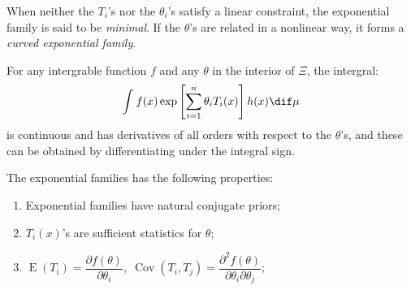 \begin{definition}
	When neither the $T_i$'s nor the $\theta_i$'s satisfy a linear constraint, the exponential family is said to be \emph{minimal}. If the $\theta$'s are related in a nonlinear way, it forms a \emph{curved exponential family}.
\end{definition}
\begin{theorem}\label{theo:ExponentialFamilyDiff}
	For any intergrable function $f$ and any $\theta$ in the interior of $\Xi$, the intergral:
	\begin{equation*}
		\int_{}^{}f(x)\exp\left[\sum_{i=1}^{n}\theta_iT_i(x)\right]h(x)\dif\mu
	\end{equation*}
	is continuous and has derivatives of all orders with respect to the $\theta$'s, and these can be obtained by differentiating under the integral sign.
\end{theorem}
\begin{property}
	The exponential families has the following properties:
	\begin{enumerate}
		\item Exponential families have natural conjugate priors;
		\item $T_i(x)$'s are sufficient statistics for $\theta$;
		\item $\operatorname{E}(T_i)=\dfrac{\partial f(\theta)}{\partial\theta_i},\;\operatorname{Cov}(T_i,T_j)=\dfrac{\partial^2f(\theta)}{\partial\theta_i\partial\theta_j}$;
	\end{enumerate}
\end{property}
